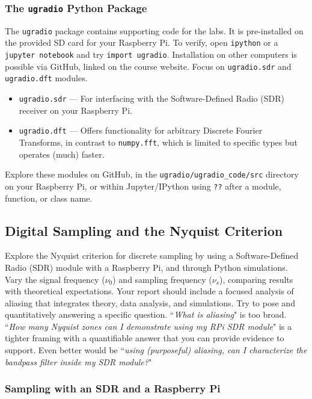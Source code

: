 \documentclass[11pt,preprint]{aastex}
\begin{document}
\subsubsection{The {\tt ugradio} Python Package}

\noindent
The {\tt ugradio} package contains supporting code for the labs. It is pre-installed on the provided SD card for your Raspberry Pi. To verify, open {\tt ipython} or a {\tt jupyter notebook} and try {\tt import ugradio}. Installation on other computers is possible via GitHub, linked on the course website.
Focus on {\tt ugradio.sdr} and {\tt ugradio.dft} modules.

\begin{itemize}
    \item {\tt ugradio.sdr} --- For interfacing with the Software-Defined Radio (SDR) receiver on your Raspberry Pi.
    \item {\tt ugradio.dft} --- Offers functionality for arbitrary Discrete Fourier Transforms, in contrast to {\tt numpy.fft}, which is limited to specific types but operates (much) faster.
\end{itemize}

\noindent
Explore these modules on GitHub, in the {\tt ugradio/ugradio\_code/src} directory on your Raspberry Pi, or within Jupyter/IPython using {\tt ??} after a module, function, or class name.




\subsection{Digital Sampling and the Nyquist Criterion}

\noindent
Explore the Nyquist criterion for discrete sampling by using a Software-Defined Radio (SDR) module with a Raspberry Pi, and through Python simulations. Vary the signal frequency ($\nu_0$) and sampling frequency ($\nu_s$), comparing results with theoretical expectations. Your report should include a focused analysis of aliasing that integrates theory, data analysis, and simulations.
Try to pose and quantitatively answering a specific question.
``{\it What is aliasing}" is too broad. ``{\it How many Nyquist zones
can I demonstrate using my RPi SDR module}" is a tighter framing with
a quantifiable answer that you can provide evidence to support. Even better
would be ``{\it using (purposeful) aliasing, can I characterize
the bandpass filter inside my SDR module?}"

\subsubsection{Sampling with an SDR and a Raspberry Pi}
\end{document}
